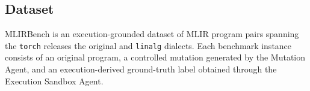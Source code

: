 \documentclass[sigplan,screen,review,anonymous]{acmart}
\providecommand{\DIFadd}[1]{{\protect\color{blue} \sf #1}} %
\providecommand{\DIFdel}[1]{{\protect\color{red} \scriptsize #1}} %
\providecommand{\DIFaddbegin}{} %
\providecommand{\DIFaddend}{} %
\providecommand{\DIFdelbegin}{} %
\providecommand{\DIFdelend}{} %
\begin{document}
\DIFaddbegin 





\DIFaddend \subsection{Dataset}

MLIRBench \DIFdelbegin \DIFdel{is an execution-grounded dataset of MLIR program pairs spanning the \texttt{torch} }\DIFdelend \DIFaddbegin \DIFadd{releases the original }\DIFaddend and \DIFdelbegin \DIFdel{\texttt{linalg} dialects. Each benchmark instance consists of an original program, a controlled mutation generated by the Mutation Agent, and an execution-derived ground-truth label obtained through the Execution Sandbox Agent.
}%
\end{document}
